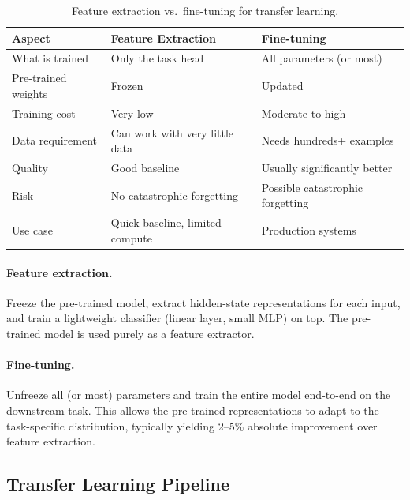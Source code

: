 \begin{table}[H]
\centering
\small
\begin{tabularx}{\textwidth}{@{}l X X@{}}
\toprule
\textbf{Aspect} & \textbf{Feature Extraction} & \textbf{Fine-tuning} \\
\midrule
What is trained & Only the task head & All parameters (or most) \\
Pre-trained weights & Frozen & Updated \\
Training cost & Very low & Moderate to high \\
Data requirement & Can work with very little data & Needs hundreds+ examples \\
Quality & Good baseline & Usually significantly better \\
Risk & No catastrophic forgetting & Possible catastrophic forgetting \\
Use case & Quick baseline, limited compute & Production systems \\
\bottomrule
\end{tabularx}
\caption{Feature extraction vs.\ fine-tuning for transfer learning.}
\label{tab:feature-vs-finetune}
\end{table}

\paragraph{Feature extraction.}
Freeze the pre-trained model, extract hidden-state representations for each
input, and train a lightweight classifier (linear layer, small MLP) on top.
The pre-trained model is used purely as a feature extractor.

\paragraph{Fine-tuning.}
Unfreeze all (or most) parameters and train the entire model end-to-end on
the downstream task.  This allows the pre-trained representations to adapt to
the task-specific distribution, typically yielding 2--5\% absolute improvement
over feature extraction.

\subsection{Transfer Learning Pipeline}

